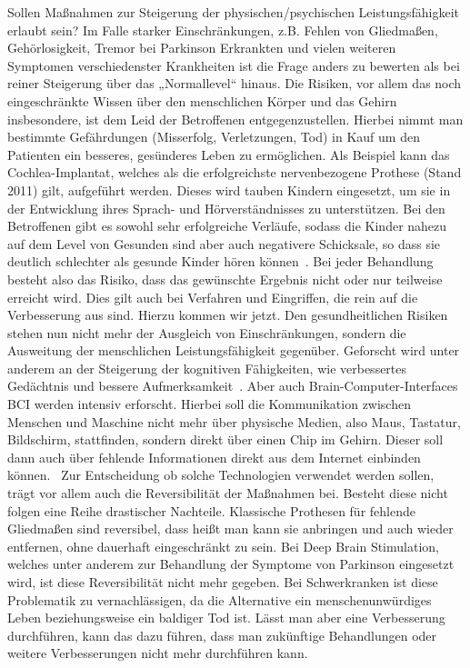 \documentclass[a4paper,
DIV=13,
12pt,
BCOR=10mm,
department=FakEI,
twoside,
parskip=half,
automark,
]{OTHRartcl}
\begin{document}
Sollen Maßnahmen zur Steigerung der physischen/psychischen Leistungsfähigkeit erlaubt sein? Im Falle starker Einschränkungen, z.B. Fehlen von Gliedmaßen, Gehörlosigkeit, Tremor bei Parkinson Erkrankten und vielen weiteren
Symptomen verschiedenster Krankheiten ist die Frage anders zu bewerten als bei reiner Steigerung über das „Normallevel“ hinaus. Die Risiken, vor allem das noch eingeschränkte Wissen über den menschlichen Körper und das Gehirn
insbesondere, ist dem Leid der Betroffenen entgegenzustellen. Hierbei nimmt man bestimmte Gefährdungen (Misserfolg, Verletzungen, Tod) in Kauf um den Patienten ein besseres, gesünderes Leben zu ermöglichen. Als Beispiel kann das
Cochlea-Implantat, welches als die erfolgreichste nervenbezogene Prothese (Stand 2011) gilt, aufgeführt werden. Dieses wird tauben Kindern eingesetzt, um sie in der Entwicklung ihres Sprach- und Hörverständnisses zu unterstützen.
Bei den Betroffenen gibt es sowohl sehr erfolgreiche Verläufe, sodass die Kinder nahezu auf dem Level von Gesunden sind aber auch negativere Schicksale, so dass sie deutlich schlechter als gesunde Kinder hören können~\cite{lee2016cochlear}. 
Bei jeder Behandlung besteht also das Risiko, dass das gewünschte Ergebnis nicht oder nur teilweise erreicht wird. Dies gilt auch bei Verfahren und Eingriffen, die rein auf die Verbesserung aus sind. Hierzu kommen wir jetzt.
Den gesundheitlichen Risiken stehen nun nicht mehr der Ausgleich von Einschränkungen, sondern die Ausweitung der menschlichen Leistungsfähigkeit gegenüber. Geforscht wird unter anderem an der Steigerung der kognitiven Fähigkeiten,
wie verbessertes Gedächtnis und bessere Aufmerksamkeit~\cite{SUTHANA2014996}. Aber auch Brain-Computer-Interfaces BCI werden intensiv erforscht. Hierbei soll die Kommunikation zwischen Menschen und Maschine nicht mehr über physische Medien,
also Maus, Tastatur, Bildschirm, stattfinden, sondern direkt über einen Chip im Gehirn. Dieser soll dann auch über fehlende Informationen direkt aus dem Internet einbinden können.~\cite{neuralink} Zur Entscheidung ob solche Technologien verwendet
werden sollen, trägt vor allem auch die Reversibilität der Maßnahmen bei. Besteht diese nicht folgen eine Reihe drastischer Nachteile. Klassische Prothesen für fehlende Gliedmaßen sind reversibel, dass heißt man kann sie anbringen und auch wieder
entfernen, ohne dauerhaft eingeschränkt zu sein. Bei Deep Brain Stimulation, welches unter anderem zur Behandlung der Symptome von Parkinson eingesetzt wird, ist diese Reversibilität nicht mehr gegeben. Bei Schwerkranken ist diese Problematik zu
vernachlässigen, da die Alternative ein menschenunwürdiges Leben beziehungsweise ein baldiger Tod ist. Lässt man aber eine Verbesserung durchführen, kann das dazu führen, dass man zukünftige Behandlungen oder weitere Verbesserungen nicht mehr durchführen kann.
\end{document}
